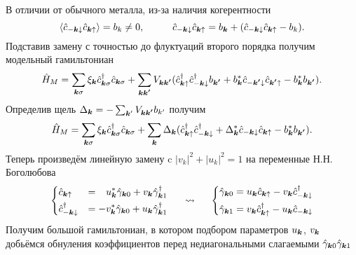 В отличии от обычного металла, из-за наличия когерентности
\begin{equation*}
	\langle \hat{c}_{-{\boldsymbol{k}}\downarrow}\hat{c}_{{\boldsymbol{k}}\uparrow} \rangle  = b_k \neq 0,
	\hspace{1 cm}
	\hat{c}_{-{\boldsymbol{k}}\downarrow}\hat{c}_{{\boldsymbol{k}}\uparrow} = b_{{\boldsymbol{k}}} + (\hat{c}_{-{\boldsymbol{k}}\downarrow}\hat{c}_{{\boldsymbol{k}}\uparrow}  - b_k).
\end{equation*}
Подставив замену с точностью до флуктуаций второго порядка получим модельный гамильтониан
\begin{equation*}
	\hat{H}_M = \sum_{{\boldsymbol{k}} \sigma} \xi_{{\boldsymbol{k}}} \hat{c}_{{\boldsymbol{k}} \sigma}^\dagger \hat{c}_{{\boldsymbol{k}} \sigma}
	+
	\sum_{{\boldsymbol{k}} {\boldsymbol{k'}}} V_{{\boldsymbol{k}} {\boldsymbol{k'}}} (\hat{c}_{{\boldsymbol{k}}\uparrow}^\dagger \hat{c}_{-{\boldsymbol{k}}\downarrow}^\dagger b_{{\boldsymbol{k'}}} + b_{{\boldsymbol{k}}}^* \hat{c}_{-{\boldsymbol{k'}}\downarrow} \hat{c}_{{\boldsymbol{k'}}\uparrow} - b_{{\boldsymbol{k}}}^* b_{{\boldsymbol{k'}}}).
\end{equation*}
Определив щель $\Delta_{{\boldsymbol{k}}} = - \sum_{{\boldsymbol{k}}'} V_{{\boldsymbol{k}} {\boldsymbol{k'}}} b_{k'}$ получим
\begin{equation*}
	\hat{H}_M = \sum_{{\boldsymbol{k}} \sigma} \xi_{{\boldsymbol{k}}} \hat{c}_{{\boldsymbol{k}} \sigma}^\dagger \hat{c}_{{\boldsymbol{k}} \sigma}
	+
	\sum_{{\boldsymbol{k}}} \Delta_{{\boldsymbol{k}}}(\hat{c}_{{\boldsymbol{k}}\uparrow}^\dagger \hat{c}_{-{\boldsymbol{k}}\downarrow}^\dagger + \Delta_{{\boldsymbol{k}}}^* \hat{c}_{-{\boldsymbol{k}}\downarrow} \hat{c}_{{\boldsymbol{k}}\uparrow} - b_{{\boldsymbol{k}}}^* b_{{\boldsymbol{k'}}}).
\end{equation*}
Теперь произведём линейную замену c $|v_k|^2 + |u_k|^2 = 1$ на переменные Н.Н. Боголюбова
\begin{equation*}
\left\{
	\begin{aligned}
		&\hat{c}_{{\boldsymbol{k}} \uparrow} &= \phantom{-} u_{{\boldsymbol{k}}}^* \hat{\gamma}_{{\boldsymbol{k}} 0} + v_{{\boldsymbol{k}}} \hat{\gamma}_{{\boldsymbol{k}} 1}^\dagger \\
		&\hat{c}_{-{\boldsymbol{k}} \downarrow}^\dagger &= -v_{{\boldsymbol{k}}}^* \hat{\gamma}_{{\boldsymbol{k}} 0} + u_{{\boldsymbol{k}}} \hat{\gamma}_{{\boldsymbol{k}} 1}^\dagger	
	\end{aligned}
\right.
\hspace{0.5 cm}
\leadsto
\hspace{0.5 cm}
\left\{
	\begin{aligned}
		\hat{\gamma}_{{\boldsymbol{k}} 0} = u_{{\boldsymbol{k}}} \hat{c}_{{\boldsymbol{k}} \uparrow}- v_{{\boldsymbol{k}}} \hat{c}_{-{\boldsymbol{k}}\downarrow}^\dagger \\
		\hat{\gamma}_{{\boldsymbol{k}} 1} = v_{{\boldsymbol{k}}} \hat{c}_{{\boldsymbol{k}} \uparrow}^\dagger - u_{{\boldsymbol{k}}} \hat{c}_{-{\boldsymbol{k}}\downarrow}
	\end{aligned}
\right.
\end{equation*}
Получим большой гамильтониан, в котором подбором параметров $u_{{\boldsymbol{k}}}$, $v_{{\boldsymbol{k}}}$ добьёмся обнуления коэффициентов перед недиагональными слагаемыми $\hat{\gamma}_{{\boldsymbol{k}} 0}\hat{\gamma}_{{\boldsymbol{k}} 1}$
